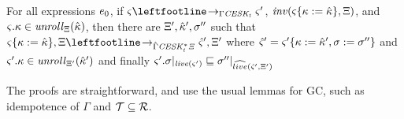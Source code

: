 {\begin{theorem}
  For all expressions $e_0$,
  if $\mstate \stepto_{\Gamma\CESKt} \mstate'$,
  $\mathit{inv}(\varsigma\{ \kappa := {\hat{\kappa}} \},\Xi)$,
  and $\varsigma.\kappa \in \mathit{unroll}_{\Xi}({\hat{\kappa}})$, then
  there are $\Xi',{\hat{\kappa}}',\sigma''$ such that
  $\mstate\set{\mkont := \makont},\mktab \stepto_{\hat\Gamma\CESKKstart} \mastate',\mktab'$ where
  $\hat\varsigma' = \varsigma'\{ \kappa := {\hat{\kappa}}',\sigma:=\sigma'' \}$
  and $\varsigma'.\kappa \in \mathit{unroll}_{\Xi'}({\hat{\kappa}}')$
  and finally $\varsigma'.\sigma|_{\mathit{live}(\varsigma')} \sqsubseteq \sigma''|_{\widehat{live}(\hat\varsigma',\Xi')}$
\end{theorem}
The proofs are straightforward, and use the usual lemmas for GC, such as idempotence of $\Gamma$ and ${\mathcal T} \subseteq {\mathcal R}$.
}
